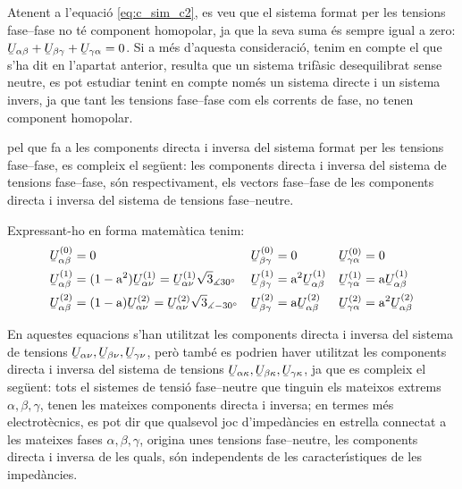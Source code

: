 Atenent a l'equaci\'{o} \eqref{eq:c_sim_c2}, es veu que el sistema
format per les tensions fase--fase no t\'{e} component homopolar, ja que
la seva suma  \'{e}s sempre igual a zero: $\cmplx{U}_{\alpha\beta} +
\cmplx{U}_{\beta\gamma} + \cmplx{U}_{\gamma\alpha} = 0$. Si a m\'{e}s
d'aquesta consideraci\'{o}, tenim en compte el que s'ha dit en l'apartat
anterior, resulta que un sistema trif\`{a}sic desequilibrat sense
neutre, es pot estudiar tenint en compte nom\'{e}s un sistema directe i
un sistema invers, ja que tant les tensions fase--fase com els
corrents de fase, no tenen component homopolar.

pel que fa a les components directa i inversa del sistema format per
les tensions fase--fase, es compleix el seg\"{u}ent: les components
directa i inversa del sistema de tensions fase--fase, s\'{o}n
respectivament, els vectors fase--fase de les components directa i
inversa del sistema de tensions fase--neutre.

Expressant-ho en forma matem\`{a}tica tenim:
\begin{subequations}
\begin{align}
   \cmplx{U}_{\alpha\beta}\ap{(0)} &= 0 &
   \cmplx{U}_{\beta\gamma}\ap{(0)} &= 0 &
   \cmplx{U}_{\gamma\alpha}\ap{(0)} &= 0 \\
   \cmplx{U}_{\alpha\beta}\ap{(1)} &= (1-\au^2) \cmplx{U}_{\alpha\nu}\ap{(1)} =
   \cmplx{U}_{\alpha\nu}\ap{(1)} \sqrt{3}_{\measuredangle 30\degree} &
   \cmplx{U}_{\beta\gamma}\ap{(1)} &= \au^2 \cmplx{U}_{\alpha\beta}\ap{(1)} &
   \cmplx{U}_{\gamma\alpha}\ap{(1)} &= \au \cmplx{U}_{\alpha\beta}\ap{(1)} \label{eq:c_sim_a3} \\
   \cmplx{U}_{\alpha\beta}\ap{(2)} &= (1-\au) \cmplx{U}_{\alpha\nu}\ap{(2)}  =
   \cmplx{U}_{\alpha\nu}\ap{(2)} \sqrt{3}_{\measuredangle -30\degree}&
   \cmplx{U}_{\beta\gamma}\ap{(2)} &= \au \cmplx{U}_{\alpha\beta}\ap{(2)} &
   \cmplx{U}_{\gamma\alpha}\ap{(2)} &= \au^2 \cmplx{U}_{\alpha\beta}\ap{(2)} \label{eq:c_sim_b3}
\end{align}
\end{subequations}

En aquestes equacions s'han utilitzat les components directa i
inversa del sistema de tensions
$\cmplx{U}_{\alpha\nu},\cmplx{U}_{\beta\nu},\cmplx{U}_{\gamma\nu}$,
per\`{o} tamb\'{e} es podrien haver utilitzat les components directa i
inversa del sistema de tensions
$\cmplx{U}_{\alpha\kappa},\cmplx{U}_{\beta\kappa},\cmplx{U}_{\gamma\kappa}$,
ja que es compleix el seg\"{u}ent: tots el sistemes de tensi\'{o}
fase--neutre que tinguin els mateixos extrems $\alpha, \beta,
\gamma$, tenen les mateixes components directa i inversa; en termes
m\'{e}s electrot\`{e}cnics, es pot dir que qualsevol joc d'imped\`{a}ncies en
estrella connectat a les mateixes fases $\alpha, \beta, \gamma$,
origina unes tensions fase--neutre, les components directa i inversa
de les quals, s\'{o}n independents de les caracter\'{\i}stiques de les
imped\`{a}ncies.


